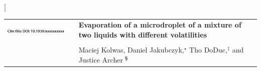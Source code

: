 \documentclass[twoside,twocolumn,9pt]{article}
\begin{document}
\twocolumn[
  \begin{@twocolumnfalse}
\vspace{3cm}
\sffamily
\begin{tabular}{m{4.5cm} p{13.5cm} }

\includegraphics{head_foot/DOI} & \noindent
\LARGE{\textbf{Evaporation of a microdroplet of a mixture of two liquids with different volatilities}}\\
\vspace{0.3cm} & \vspace{0.3cm} \\

 & \noindent\large{Maciej Kolwas, Daniel Jakubczyk,$^{\star}$ Tho DoDuc,$^{\ddag}$ and Justice Archer$\: ^{\mbox{\footnotesize \textsection}}$} \\


\end{tabular}
\end{@twocolumnfalse}
\end{document}

